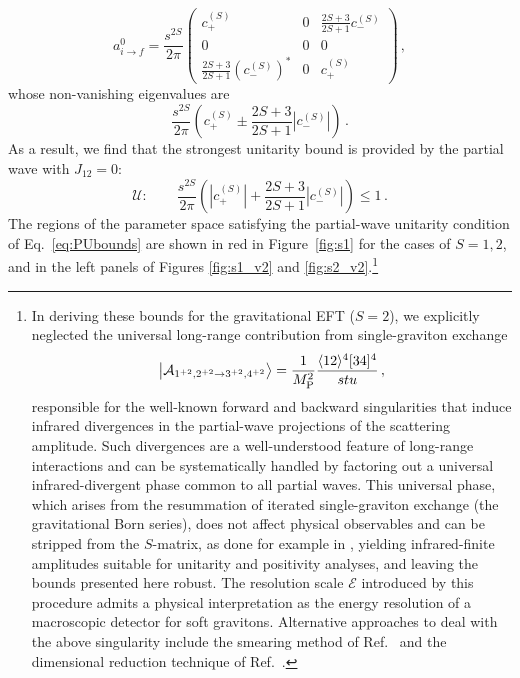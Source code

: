 %
\begin{equation}\label{eq:partialwavecoeffs}
    a^{0}_{i\to f} =
    \frac{s^{2S}}{2\pi}
    \begin{pmatrix}
        c_+^{(S)} & 0 
        & \frac{2S+3}{2S+1}c_-^{(S)} \\
        0 & 0 
        & 0\\
        \frac{2S+3}{2S+1}(c_-^{(S)})^* & 0 
        & c_+^{(S)}
    \end{pmatrix}\,,
\end{equation}
%
whose non-vanishing eigenvalues are
%
\begin{equation}
    \frac{s^{2S}}{2\pi}\left(c_+^{(S)}\pm \frac{2S+3}{2S+1}|c_-^{(S)}| \right)\,.
\end{equation}
%
As a result, we find that the strongest unitarity bound is provided by the partial wave with $J_{12}=0$:
%
\begin{equation}
\label{eq:PUbounds}
    \mathscr{U}:\qquad \frac{s^{2S}}{2\pi}\left(|c_+^{(S)}|+\frac{2S+3}{2S+1}|c_-^{(S)}|\right) \le 1\,.
\end{equation}
The regions of the parameter space satisfying the partial-wave unitarity condition of Eq.~\eqref{eq:PUbounds} are shown in red in Figure~\ref{fig:s1} for the cases of $S=1,2$, and in the left panels of Figures \ref{fig:s1_v2} and \ref{fig:s2_v2}.\footnote{In deriving these bounds for the gravitational EFT ($S=2$), we explicitly neglected the universal long-range contribution from single-graviton exchange
\begin{equation}
    \ket{\mathcal A_{1^{+2},2^{+2} \to 3^{+2},4^{+2}}} = \frac{1}{M_{\text{P}}^2}\frac{\langle 1 2 \rangle^4 \lbrack 3 4 \rbrack^4}{stu}\,,
\end{equation}
responsible for the well-known forward and backward singularities that induce infrared divergences in the partial-wave projections of the scattering amplitude. Such divergences are a well-understood feature of long-range interactions and can be systematically handled by factoring out a universal infrared-divergent phase \cite{Weinberg:1965nx} common to all partial waves. This universal phase, which arises from the resummation of iterated single-graviton exchange (the gravitational Born series), does not affect physical observables and can be stripped from the $S$-matrix, as done for example in \cite{Blas:2020dyg,Bellazzini:2025bay}, yielding infrared-finite amplitudes suitable for unitarity and positivity analyses, and leaving the bounds presented here robust. The resolution scale $\mathcal E$ introduced by this procedure \cite{Bellazzini:2025bay} admits a physical interpretation as the energy resolution of a macroscopic detector for soft gravitons. 
Alternative approaches to deal with the above singularity include the smearing method of Ref.~\cite{Caron-Huot:2021rmr} and the dimensional reduction technique of Ref.~\cite{Bellazzini:2019xts}.}


